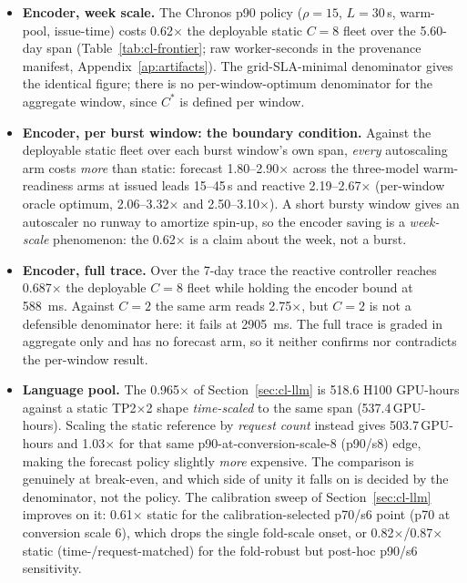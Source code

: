 \begin{itemize}
\item \textbf{Encoder, week scale.} The Chronos p90 policy ($\rho{=}15$,
$L{=}30$\,\si{\second}, warm-pool, issue-time) costs 0.62$\times$ the
deployable static $C{=}8$ fleet over the 5.60-day span
(Table~\ref{tab:cl-frontier}; raw worker-seconds in the provenance manifest,
Appendix~\ref{ap:artifacts}). The grid-SLA-minimal denominator gives the
identical figure; there is no per-window-optimum denominator for the aggregate
window, since $C^{*}$ is defined per window.
\item \textbf{Encoder, per burst window: the boundary condition.} Against
the deployable static fleet over each burst window's own span, \emph{every}
autoscaling arm costs \emph{more} than static: forecast 1.80--2.90$\times$
across the three-model warm-readiness arms at issued leads 15--45\,\si{\second}
and reactive 2.19--2.67$\times$ (per-window oracle optimum, 2.06--3.32$\times$
and 2.50--3.10$\times$). A short bursty window gives an autoscaler no runway to
amortize spin-up, so the encoder saving is a \emph{week-scale} phenomenon: the
0.62$\times$ is a claim about the week, not a burst.
\item \textbf{Encoder, full trace.} Over the 7-day trace the reactive
controller reaches 0.687$\times$ the deployable $C{=}8$ fleet while holding the
encoder bound at \SI{588}{\milli\second}. Against $C{=}2$ the same arm reads
2.75$\times$, but $C{=}2$ is not a defensible denominator here: it fails at
\SI{2905}{\milli\second}. The full trace is graded in aggregate only and has no
forecast arm, so it neither confirms nor contradicts the per-window result.
\item \textbf{Language pool.} The 0.965$\times$ of Section~\ref{sec:cl-llm} is
518.6 H100 GPU-hours against a static TP2$\times$2 shape \emph{time-scaled} to
the same span (537.4\,GPU-hours). Scaling the static reference by \emph{request
count} instead gives 503.7\,GPU-hours and 1.03$\times$ for that same
p90-at-conversion-scale-8 (p90/s8) edge, making the forecast policy slightly
\emph{more} expensive. The comparison is
genuinely at break-even, and which side of unity it falls on is decided by the
denominator, not the policy. The calibration sweep of Section~\ref{sec:cl-llm}
improves on it: 0.61$\times$ static for the calibration-selected p70/s6 point
(p70 at conversion scale 6),
which drops the single fold-scale onset, or 0.82$\times$/0.87$\times$ static
(time-/request-matched) for the fold-robust but post-hoc p90/s6
sensitivity.
\end{itemize}

